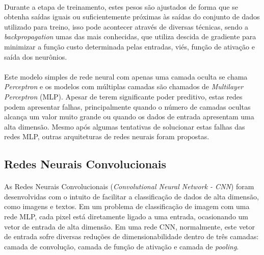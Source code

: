 \documentclass[grad,numbers]{coppe}
\begin{document}
  	\paragraph{}Durante a etapa de treinamento, estes pesos são ajustados de forma que se obtenha saídas iguais ou suficientemente próximas às saídas do conjunto de dados utilizado para treino, isso pode acontecer através de diversas técnicas, sendo a \textit{backpropagation} umas das mais conhecidas, que utiliza descida de gradiente\cite{nn-raul-rojas} para minimizar a função custo determinada pelas entradas, viés, função de ativação e saída dos neurônios.
  	\paragraph{}Este modelo simples de rede neural com apenas uma camada oculta se chama \textit{Perceptron} e os modelos com múltiplas camadas são chamados de \textit{Multilayer Perceptron} (MLP). Apesar de terem significante poder preditivo, estas redes podem apresentar falhas, principalmente quando o número de camadas ocultas alcança um valor muito grande ou quando os dados de entrada apresentam uma alta dimensão. Mesmo após algumas tentativas de solucionar estas falhas das redes MLP, outras arquiteturas de redes neurais foram propostas.
	  \subsection{Redes Neurais Convolucionais}
		  \paragraph{}As Redes Neurais Convolucionais (\textit{Convolutional Neural Network - CNN}) foram desenvolvidas com o intuito de facilitar a classificação de dados de alta dimensão, como imagens e textos. Em um problema de classificação de imagem com uma rede MLP, cada pixel está diretamente ligado a uma entrada, ocasionando um vetor de entrada de alta dimensão. Em uma rede CNN, normalmente, este vetor de entrada sofre diversas reduções de dimensionabilidade dentro de três camadas: camada de convolução, camada de função de ativação e camada de \textit{pooling}.
\end{document}
